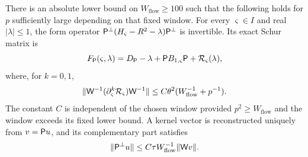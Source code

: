 \begin{lemma}
\label{inf:flow-complement}
There is an absolute lower bound on $W_{\mathrm{flow}}\ge100$ such
that the following holds for $p$ sufficiently large depending on
that fixed window. For every $\varsigma\in I$ and real $|\lambda|\le1$,
the form operator
$\mathsf P^\perp(H_\varsigma-R^2-\lambda)\mathsf P^\perp$ is invertible. Its exact
Schur matrix is
\begin{equation}\label{inf:flow-schur}
 F_\mathsf P(\varsigma,\lambda)=D_\mathsf P-\lambda+
                        \mathsf P B_{1,\varsigma}\mathsf P+\mathcal R_\varsigma(\lambda),
\end{equation}
where, for $k=0,1$,
\begin{equation}\label{inf:flow-schur-remainder}
 \lVert \mathsf W^{-1}(\partial_\varsigma^k\mathcal R_\varsigma)\mathsf W^{-1}\rVert
 \le C\theta^2(W_{\mathrm{flow}}^{-1}+p^{-1}).
\end{equation}
The constant $C$ is independent of the chosen window provided
$p^2\ge W_{\mathrm{flow}}$ and the window exceeds its fixed lower
bound. A kernel vector is reconstructed uniquely from $v=\mathsf P u$,
and its complementary part satisfies
\begin{equation}\label{inf:flow-Q-reconstruction}
 \lVert \mathsf P^\perp u\rVert\le C\tau W_{\mathrm{flow}}^{-1}
                                      \lVert \mathsf W v\rVert.
\end{equation}
\end{lemma}
